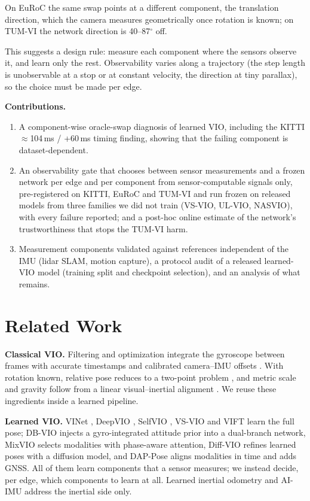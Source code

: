 \documentclass[letterpaper,journal]{IEEEtran}
\begin{document}
On EuRoC the same swap points at a different component, the translation direction, which the camera measures geometrically once rotation is known; on TUM-VI the network direction is 40--87$^\circ$ off.

This suggests a design rule: measure each component where the sensors observe it, and learn only the rest. Observability varies along a trajectory (the step length is unobservable at a stop or at constant velocity, the direction at tiny parallax), so the choice must be made per edge.

\textbf{Contributions.}
\begin{enumerate}
\item A component-wise oracle-swap diagnosis of learned VIO, including the KITTI $\approx$104\,ms / +60\,ms timing finding, showing that the failing component is dataset-dependent.
\item An observability gate that chooses between sensor measurements and a frozen network per edge and per component from sensor-computable signals only, pre-registered on KITTI, EuRoC and TUM-VI and run frozen on released models from three families we did not train (VS-VIO, UL-VIO, NASVIO), with every failure reported; and a post-hoc online estimate of the network's trustworthiness that stops the TUM-VI harm.
\item Measurement components validated against references independent of the IMU (lidar SLAM, motion capture), a protocol audit of a released learned-VIO model (training split and checkpoint selection), and an analysis of what remains.
\end{enumerate}

\section{Related Work}

\textbf{Classical VIO.} Filtering \cite{Mourikis2007} and optimization \cite{Leutenegger2015,Qin2018,Campos2021} integrate the gyroscope between frames with accurate timestamps and calibrated camera--IMU offsets \cite{Furgale2013,Qin2018b}. With rotation known, relative pose reduces to a two-point problem \cite{Kneip2011,Troiani2014}, and metric scale and gravity follow from a linear visual--inertial alignment \cite{Martinelli2014,Qin2017}. We reuse these ingredients inside a learned pipeline.

\textbf{Learned VIO.} VINet \cite{Clark2017}, DeepVIO \cite{Han2019}, SelfVIO \cite{Almalioglu2022}, VS-VIO \cite{Yang2022} and VIFT \cite{Kurt2024} learn the full pose; DB-VIO \cite{Wan2026} injects a gyro-integrated attitude prior into a dual-branch network, MixVIO \cite{Ma2026} selects modalities with phase-aware attention, Diff-VIO \cite{Qin2026} refines learned poses with a diffusion model, and DAP-Pose \cite{DAPPose} aligns modalities in time and adds GNSS. All of them learn components that a sensor measures; we instead decide, per edge, which components to learn at all. Learned inertial odometry \cite{Liu2020,Herath2020} and AI-IMU \cite{Brossard2020} address the inertial side only.
\end{document}

